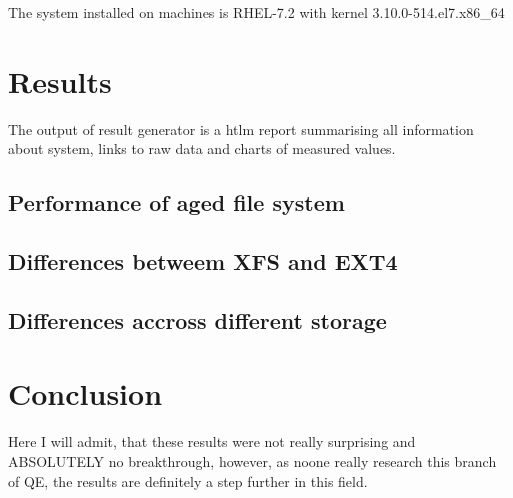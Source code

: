 \documentclass[
  color, %
  table, %
  lof,   %
  lot,   %
]{fithesis3}
\begin{document}
The system installed on machines is RHEL-7.2 with kernel 3.10.0-514.el7.x86\_64 

\chapter{Results}
The output of result generator is a htlm report summarising all information about system, links to raw data and charts of measured values.

\section{Performance of aged file system}
\section{Differences betweem XFS and EXT4}
\section{Differences accross different storage}
\chapter{Conclusion}
Here I will admit, that these results were not really surprising and ABSOLUTELY no breakthrough, however, as noone really research this branch of QE, the results are definitely a step further in this field.

\printbibliography
\end{document}
